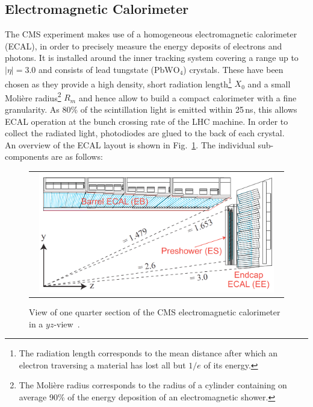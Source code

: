 \subsection{Electromagnetic Calorimeter}
\label{subsec:cms_ecal}
The CMS experiment makes use of a homogeneous electromagnetic calorimeter (ECAL), in order to precisely measure the energy deposits of electrons and photons. It is installed around the inner tracking system covering a range up to $|\eta| = 3.0$ and consists of lead tungstate (PbW$\mathrm{O}_4$) crystals. These have been chosen as they provide a high density, short radiation length\footnote{The radiation length corresponds to the mean distance after which an electron traversing a material has lost all but $1/e$ of its energy.} $X_0$ and a small Moli\`{e}re radius\footnote{The Moli\`{e}re radius corresponds to the radius of a cylinder containing on average 90\% of the energy deposition of an electromagnetic shower.} $R_m$ and hence allow to build a compact calorimeter with a fine granularity. As 80\% of the scintillation light is emitted within 25\,ns, this allows ECAL operation at the bunch crossing rate of the LHC machine. In order to collect the radiated light, photodiodes are glued to the back of each crystal.\\
An overview of the ECAL layout is shown in Fig.~\ref{fig:CMS_ecal}. The individual sub-components are as follows:
\begin{figure}[!tp]
  \centering
  \begin{tabular}{c}
    \includegraphics[width=0.95\textwidth]{figures/Figures_Experimental_Apparatus_ECALRapidity.png}
  \end{tabular}
  \caption{View of one quarter section of the CMS electromagnetic calorimeter in a $yz$-view~\cite{bib:cmsptdr1}.}
  \label{fig:CMS_ecal}
\end{figure}
